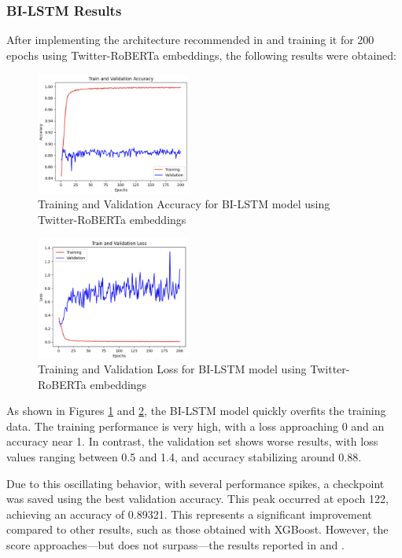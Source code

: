 \subsubsection{BI-LSTM Results}

After implementing the architecture recommended in \cite{fieri2023offensive} and training it for 200 epochs using Twitter-RoBERTa embeddings, the following results were obtained:

\begin{figure}[H]
    \centering
    \includegraphics[width=0.45\textwidth]{images/trainingValidationAccurayBI_LSTM.png}
    \caption{Training and Validation Accuracy for BI-LSTM model using Twitter-RoBERTa embeddings}
    \label{fig:accuracy_bilstm}
\end{figure}

\begin{figure}[H]
    \centering
    \includegraphics[width=0.45\textwidth]{images/trainingValidationLossBI_LSTM.png}
    \caption{Training and Validation Loss for BI-LSTM model using Twitter-RoBERTa embeddings}
    \label{fig:loss_bilstm}
\end{figure}

As shown in Figures \ref{fig:accuracy_bilstm} and \ref{fig:loss_bilstm}, the BI-LSTM model quickly overfits the training data. The training performance is very high, with a loss approaching 0 and an accuracy near 1. In contrast, the validation set shows worse results, with loss values ranging between 0.5 and 1.4, and accuracy stabilizing around 0.88.

Due to this oscillating behavior, with several performance spikes, a checkpoint was saved using the best validation accuracy. This peak occurred at epoch 122, achieving an accuracy of 0.89321. This represents a significant improvement compared to other results, such as those obtained with XGBoost. However, the score approaches—but does not surpass—the results reported in \cite{fieri2023offensive} and \cite{toktarova2023hate}.


